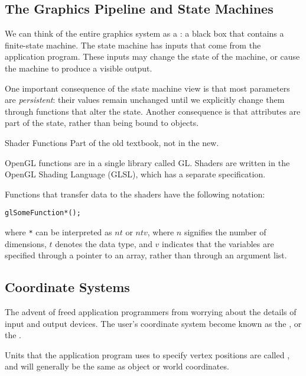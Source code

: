 \documentclass[../notes.tex]{subfiles}
\begin{document}
      \subsection{The Graphics Pipeline and State Machines}
        We can think of the entire graphics system as a :
        a black box that contains a finite-state machine.
        The state machine has inputs that come from the application program.
        These inputs may change the state of the machine, or cause the machine to produce
        a visible output.

        One important consequence of the state machine view is that most parameters are
        \emph{persistent}: their values remain unchanged until we explicitly change them
        through functions that alter the state.
        Another consequence is that attributes are part of the state,
        rather than being bound to objects.

        \begin{sidenote}{Shader Functions}
          Part of the old textbook, not in the new.

          OpenGL functions are in a single library called GL.
          Shaders are written in the OpenGL Shading Language (GLSL),
          which has a separate specification.

          Functions that transfer data to the shaders have the following notation:
          \begin{center}
            \texttt{glSomeFunction*();}
          \end{center}
          where \texttt{*} can be interpreted as $nt$ or $ntv$, where $n$ signifies the number of dimensions,
          $t$ denotes the data type, and $v$ indicates that the variables are specified through
          a pointer to an array, rather than through an argument list.
        \end{sidenote}

      \subsection{Coordinate Systems}
        The advent of  freed application programmers
        from worrying about the details of input and output devices.
        The user's coordinate system become known as the ,
        or the .

        Units that the application program uses to specify vertex positions are called
        , and will generally be the same as object or world coordinates.
\end{document}
